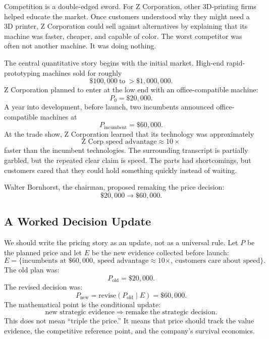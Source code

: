 Competition is a double-edged sword. For Z Corporation, other 3D-printing firms helped educate the market. Once customers understood why they might need a 3D printer, Z Corporation could sell against alternatives by explaining that its machine was faster, cheaper, and capable of color. The worst competitor was often not another machine. It was doing nothing.

The central quantitative story begins with the initial market. High-end rapid-prototyping machines sold for roughly
\begin{equation}
\$100{,}000\ \text{to}\ >\$1{,}000{,}000.
\end{equation}
Z Corporation planned to enter at the low end with an office-compatible machine:
\begin{equation}
P_0=\$20{,}000.
\end{equation}
A year into development, before launch, two incumbents announced office-compatible machines at
\begin{equation}
P_{\text{incumbent}}=\$60{,}000.
\end{equation}
At the trade show, Z Corporation learned that its technology was approximately
\begin{equation}
\text{Z Corp speed advantage}\approx 10\times
\end{equation}
faster than the incumbent technologies. The surrounding transcript is partially garbled, but the repeated clear claim is speed. The parts had shortcomings, but customers cared that they could hold something quickly instead of waiting.

Walter Bornhorst, the chairman, proposed remaking the price decision:
\begin{equation}
\$20{,}000\longrightarrow \$60{,}000.
\end{equation}

\subsection{A Worked Decision Update}

We should write the pricing story as an update, not as a universal rule. Let \(P\) be the planned price and let \(E\) be the new evidence collected before launch:
\begin{equation}
E=
\{\text{incumbents at } \$60{,}000,\ 
\text{speed advantage}\approx 10\times,\ 
\text{customers care about speed}\}.
\end{equation}
The old plan was:
\begin{equation}
P_{\text{old}}=\$20{,}000.
\end{equation}
The revised decision was:
\begin{equation}
P_{\text{new}}
=
\mathrm{revise}(P_{\text{old}}\mid E)
=
\$60{,}000.
\end{equation}
The mathematical point is the conditional update:
\begin{equation}
\text{new strategic evidence}
\Rightarrow
\text{remake the strategic decision}.
\end{equation}
This does not mean ``triple the price.'' It means that price should track the value evidence, the competitive reference point, and the company's survival economics.

